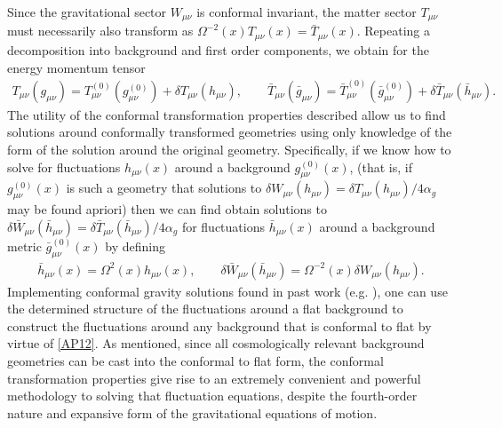 Since the gravitational sector $W_{\mu\nu}$ is conformal invariant, the matter sector $T_{\mu\nu}$ must necessarily also transform as $\Omega^{-2}(x) T_{\mu\nu}(x)=\bar{T}_{\mu\nu}(x)$. Repeating a decomposition into background and first order components, we obtain for the energy momentum tensor
%
\begin{eqnarray}
T_{\mu\nu}(g_{\mu\nu})= T^{(0)}_{\mu\nu}(g^{(0)}_{\mu\nu})+\delta T_{\mu\nu}(h_{\mu\nu}),\qquad
\bar{T}_{\mu\nu}(\bar{g}_{\mu\nu})=\bar{T}^{(0)}_{\mu\nu}(\bar{g}^{(0)}_{\mu\nu})+\delta \bar{T}_{\mu\nu}(\bar{h}_{\mu\nu}).
\label{AP11}
\end{eqnarray}
%
The utility of the conformal transformation properties described allow us to find solutions around conformally transformed geometries using only knowledge of the form of the solution around the original geometry. Specifically, if we know how to solve for fluctuations $h_{\mu\nu}(x)$ around a background $g^{(0)}_{\mu\nu}(x)$, (that is, if $g^{(0)}_{\mu\nu}(x)$ is such a geometry that solutions to $\delta W_{\mu\nu}(h_{\mu\nu})=\delta T_{\mu\nu}(h_{\mu\nu})/4\alpha_g$ may be found apriori) then we can find obtain solutions to  $\delta \bar{W}_{\mu\nu}(\bar{h}_{\mu\nu})=\delta \bar{T}_{\mu\nu}(\bar{h}_{\mu\nu})/4\alpha_g$  for fluctuations $\bar{h}_{\mu\nu}(x)$ around a background metric $\bar{g}^{(0)}_{\mu\nu}(x)$ by defining 
%
\begin{eqnarray}
\bar{h}_{\mu\nu}(x)=\Omega^2(x)h_{\mu\nu}(x),\qquad \delta \bar{W}_{\mu\nu}(\bar{h}_{\mu\nu})=\Omega^{-2}(x)\delta W_{\mu\nu}(h_{\mu\nu}).
\label{AP12}
\end{eqnarray}
%
Implementing conformal gravity solutions found in past work (e.g. \cite{mannheim_2006}), one can use the determined structure of the fluctuations around a flat background to construct the fluctuations around any background that is conformal to flat by virtue of \eqref{AP12}. As mentioned, since all cosmologically relevant background geometries can be cast into the conformal to flat form, the conformal transformation properties give rise to an extremely convenient and powerful methodology to solving that fluctuation equations, despite the fourth-order nature and expansive form of the gravitational equations of motion.

